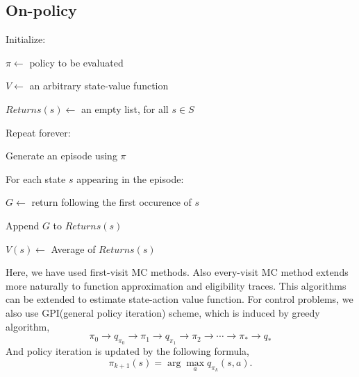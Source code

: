 \documentclass[11pt,a4paper]{article}
\begin{document}
\subsection{On-policy}
\begin{tcolorbox}
Initialize:\par 
\hspace{1cm} $\pi \leftarrow$ policy to be evaluated \par 
\hspace{1cm} $V \leftarrow$ an arbitrary state-value function \par 
\hspace{1cm} $Returns(s) \leftarrow$ an empty list, for all $s \in S$ \par 

Repeat forever:\par 
\hspace{1cm} Generate an episode using $\pi$\par 
\hspace{1cm} For each state $s$ appearing in the episode:\par 
\hspace{2cm} $G \leftarrow$ return following the first occurence of $s$ \par
\hspace{2cm} Append $G$ to $Returns(s)$ \par 
\hspace{2cm} $V(s) \leftarrow$ Average of $Returns(s)$
\end{tcolorbox}
Here, we have used first-visit MC methods. Also every-visit MC method extends more naturally to function approximation and eligibility traces. This algorithms can be extended to estimate state-action value function. For control problems, we also use GPI(general policy iteration) scheme, which is induced by greedy algorithm,
\begin{equation}
\pi_0 \to q_{\pi_0} \to \pi_1 \to q_{\pi_1} \to \pi_2 \to \cdots \to \pi_* \to q_{*}
\end{equation}
And policy iteration is updated by the following formula,
\begin{equation}
\pi_{k+1}(s)= \arg\max_aq_{\pi_k}(s,a).
\end{equation}
\end{document}
